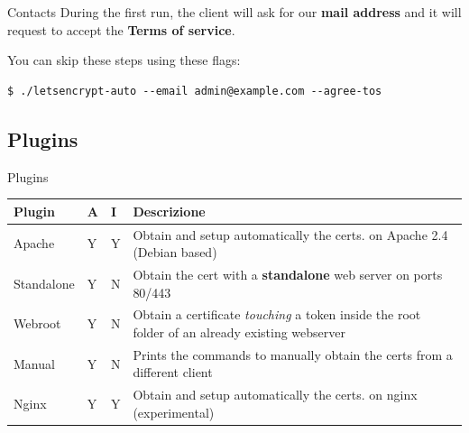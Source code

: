 \documentclass[xcolor=svgnames,11pt]{beamer}
\begin{document}
\begin{frame}[fragile]{Contacts}
During the first run, the client will ask for our \textbf{mail address}
and it will request to accept the \textbf{Terms of service}.

\medskip\pause

You can skip these steps using these flags:

\medskip

\begin{block}{}
\begin{scriptsize}
\begin{verbatim}
$ ./letsencrypt-auto --email admin@example.com --agree-tos
\end{verbatim}
\end{scriptsize}
\end{block}
\end{frame}

\subsection{Plugins}
\begin{frame}{Plugins}
\begin{center}
\begin{tabular}{p{2cm}p{0.5cm}p{0.5cm}p{5cm}}
\hline
\textbf{Plugin} & \textbf{A} & \textbf{I} & \textbf{Descrizione}\\
\hline
Apache & Y & Y & {\scriptsize Obtain and setup automatically the certs. on Apache 2.4 (Debian based)} \\
Standalone & Y & N & {\scriptsize Obtain the cert with a \textbf{standalone} web server on ports 80/443} \\
Webroot & Y & N & {\scriptsize Obtain a certificate \emph{touching} a token inside the root folder of an already existing webserver}\\
Manual & Y & N & {\scriptsize Prints the commands to manually obtain the certs from a different client} \\
Nginx & Y & Y & {\scriptsize Obtain and setup automatically the certs. on nginx (experimental)} \\
\hline
\end{tabular}
\end{center}
\end{frame}
\end{document}
